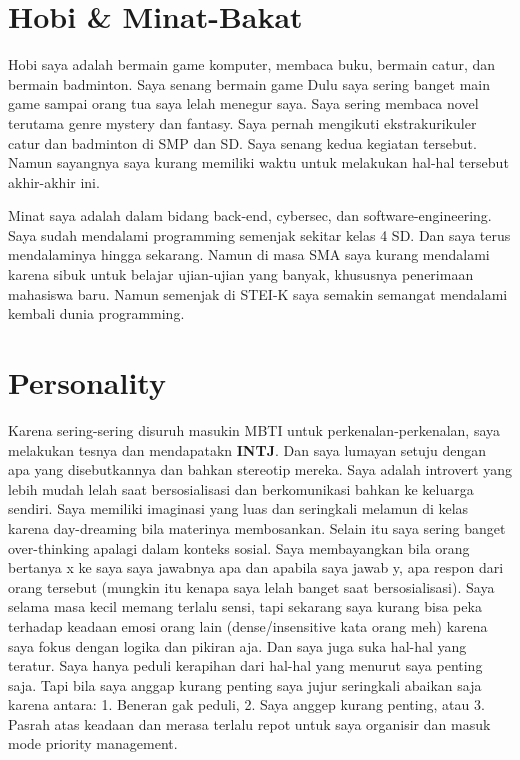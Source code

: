 \documentclass[
  letterpaper,
  DIV=11,
  numbers=noendperiod]{scrreprt}
\begin{document}
\section{\texorpdfstring{\textbf{Hobi \&
Minat-Bakat}}{Hobi \& Minat-Bakat}}\label{hobi-minat-bakat}

Hobi saya adalah bermain game komputer, membaca buku, bermain catur, dan
bermain badminton. Saya senang bermain game Dulu saya sering banget main
game sampai orang tua saya lelah menegur saya. Saya sering membaca novel
terutama genre mystery dan fantasy. Saya pernah mengikuti
ekstrakurikuler catur dan badminton di SMP dan SD. Saya senang kedua
kegiatan tersebut. Namun sayangnya saya kurang memiliki waktu untuk
melakukan hal-hal tersebut akhir-akhir ini.

Minat saya adalah dalam bidang back-end, cybersec, dan
software-engineering. Saya sudah mendalami programming semenjak sekitar
kelas 4 SD. Dan saya terus mendalaminya hingga sekarang. Namun di masa
SMA saya kurang mendalami karena sibuk untuk belajar ujian-ujian yang
banyak, khususnya penerimaan mahasiswa baru. Namun semenjak di STEI-K
saya semakin semangat mendalami kembali dunia programming.

\section{\texorpdfstring{\textbf{Personality}}{Personality}}\label{personality}

Karena sering-sering disuruh masukin MBTI untuk perkenalan-perkenalan,
saya melakukan tesnya dan mendapatakn \textbf{INTJ}. Dan saya lumayan
setuju dengan apa yang disebutkannya dan bahkan stereotip mereka. Saya
adalah introvert yang lebih mudah lelah saat bersosialisasi dan
berkomunikasi bahkan ke keluarga sendiri. Saya memiliki imaginasi yang
luas dan seringkali melamun di kelas karena day-dreaming bila materinya
membosankan. Selain itu saya sering banget over-thinking apalagi dalam
konteks sosial. Saya membayangkan bila orang bertanya x ke saya saya
jawabnya apa dan apabila saya jawab y, apa respon dari orang tersebut
(mungkin itu kenapa saya lelah banget saat bersosialisasi). Saya selama
masa kecil memang terlalu sensi, tapi sekarang saya kurang bisa peka
terhadap keadaan emosi orang lain (dense/insensitive kata orang meh)
karena saya fokus dengan logika dan pikiran aja. Dan saya juga suka
hal-hal yang teratur. Saya hanya peduli kerapihan dari hal-hal yang
menurut saya penting saja. Tapi bila saya anggap kurang penting saya
jujur seringkali abaikan saja karena antara: 1. Beneran gak peduli, 2.
Saya anggep kurang penting, atau 3. Pasrah atas keadaan dan merasa
terlalu repot untuk saya organisir dan masuk mode priority management.
\end{document}
